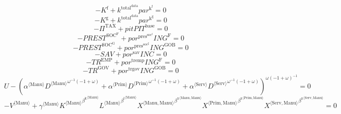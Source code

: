 \begin{equation}
-K^{\mathrm{f}} + {k^{\mathrm{total}^{\mathrm{data}}}} {{p\!a\!r}^{\mathrm{k}^{\mathrm{f}}}} = 0
\end{equation}
\begin{equation}
-K^{\mathrm{g}} + {k^{\mathrm{total}^{\mathrm{data}}}} {{p\!a\!r}^{\mathrm{k}^{\mathrm{g}}}} = 0
\end{equation}
\begin{equation}
-\Pi^{\mathrm{TAX}} + {{p\!i\!t}} {{P\!I\!T}^{\mathrm{base}}} = 0
\end{equation}
\begin{equation}
-{P\!R\!E\!S\!T}^{\mathrm{SOC}^{\mathrm{F}}} + {{p\!o\!r}^{\mathrm{pres}^{\mathrm{soc}^{\mathrm{f}}}}} {{I\!N\!G}^{\mathrm{F}}} = 0
\end{equation}
\begin{equation}
-{P\!R\!E\!S\!T}^{\mathrm{SOC}^{\mathrm{G}}} + {{p\!o\!r}^{\mathrm{pres}^{\mathrm{soc}^{\mathrm{g}}}}} {{I\!N\!G}^{\mathrm{GOB}}} = 0
\end{equation}
\begin{equation}
-{S\!A\!V} + {{p\!o\!r}^{\mathrm{sav}}} {{I\!N\!C}} = 0
\end{equation}
\begin{equation}
-{T\!R}^{\mathrm{EMP}} + {{p\!o\!r}^{\mathrm{tremp}}} {{I\!N\!G}^{\mathrm{F}}} = 0
\end{equation}
\begin{equation}
-{T\!R}^{\mathrm{GOV}} + {{p\!o\!r}^{\mathrm{trgov}}} {{I\!N\!G}^{\mathrm{GOB}}} = 0
\end{equation}
\begin{equation}
U - \left({{\alpha}^{\langle \mathrm{\mathrm{Manu}}\rangle}} {{{D}^{\langle \mathrm{Manu}\rangle}}^{{\omega}^{-1} \left(-1 + \omega\right)}} + {{\alpha}^{\langle \mathrm{\mathrm{Prim}}\rangle}} {{{D}^{\langle \mathrm{Prim}\rangle}}^{{\omega}^{-1} \left(-1 + \omega\right)}} + {{\alpha}^{\langle \mathrm{\mathrm{Serv}}\rangle}} {{{D}^{\langle \mathrm{Serv}\rangle}}^{{\omega}^{-1} \left(-1 + \omega\right)}}\right)^{{\omega} \left(-1 + \omega\right)^{-1}} = 0
\end{equation}
\begin{equation}
-{V}^{\langle \mathrm{Manu}\rangle} + {{\gamma}^{\langle \mathrm{\mathrm{Manu}}\rangle}} {{{K}^{\langle \mathrm{Manu}\rangle}}^{{\beta^{\mathrm{k}}}^{\langle \mathrm{\mathrm{Manu}}\rangle}}} {{{L}^{\langle \mathrm{Manu}\rangle}}^{{\beta^{\mathrm{l}}}^{\langle \mathrm{\mathrm{Manu}}\rangle}}} {{{X}^{\langle \mathrm{Manu},\mathrm{Manu}\rangle}}^{{\beta^{\mathrm{x}}}^{\langle \mathrm{\mathrm{Manu}},\mathrm{\mathrm{Manu}}\rangle}}} {{{X}^{\langle \mathrm{Prim},\mathrm{Manu}\rangle}}^{{\beta^{\mathrm{x}}}^{\langle \mathrm{\mathrm{Prim}},\mathrm{\mathrm{Manu}}\rangle}}} {{{X}^{\langle \mathrm{Serv},\mathrm{Manu}\rangle}}^{{\beta^{\mathrm{x}}}^{\langle \mathrm{\mathrm{Serv}},\mathrm{\mathrm{Manu}}\rangle}}} = 0
\end{equation}
